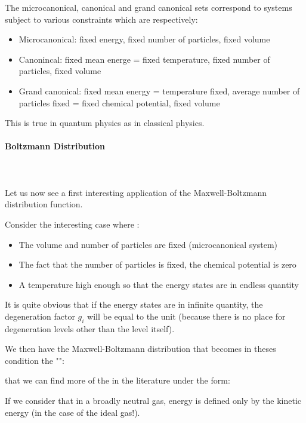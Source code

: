 	The microcanonical, canonical and grand canonical sets correspond to systems subject to various constraints which are respectively:
	\begin{itemize}
		\item Microcanonical: fixed energy, fixed number of particles, fixed volume
		\item Canonincal: fixed mean energe = fixed temperature, fixed number of particles, fixed volume
		
		\item Grand canonical: fixed mean energy = temperature fixed,  average number of particles fixed = fixed chemical potential, fixed volume
	\end{itemize}
	This is true in quantum physics as in classical physics.
	
	\paragraph{Boltzmann Distribution}\mbox{}\\\\
	Let us now see a first interesting application of the Maxwell-Boltzmann distribution function.

	Consider the interesting case where :
	\begin{itemize}
		\item The volume and number of particles are fixed (microcanonical system)
		
		\item The fact that the number of particles is fixed, the chemical potential is zero
		
		\item A temperature high enough so that the energy states are in endless quantity
	\end{itemize}
	
	It is quite obvious that if the energy states are in infinite quantity, the degeneration factor $g_i$ will be equal to the unit (because there is no place for degeneration levels other than the level itself).

	We then have the Maxwell-Boltzmann distribution that becomes in theses condition the "":
	
	that we can find more of the in the literature under the form:
	
	If we consider that in a broadly neutral gas, energy is defined only by the kinetic energy (in the case of the ideal gas!). 

